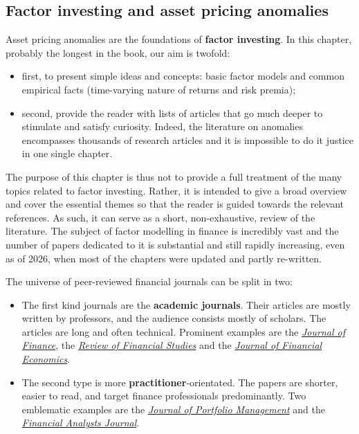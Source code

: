 \subsection{Factor investing and asset pricing anomalies}

Asset pricing anomalies are the foundations of \textbf{factor investing}. In this chapter, probably the longest in the book, our aim is twofold:

\begin{itemize}
\item first, to present simple ideas and concepts: basic factor models and common empirical facts (time-varying nature of returns and risk premia);
\item second, provide the reader with lists of articles that go much deeper to stimulate and satisfy curiosity. Indeed, the literature on anomalies encompasses thousands of research articles and it is impossible to do it justice in one single chapter.
\end{itemize}

The purpose of this chapter is thus not to provide a full treatment of the many topics related to factor investing. Rather, it is intended to give a broad overview and cover the essential themes so that the reader is guided towards the relevant references. As such, it can serve as a short, non-exhaustive, review of the literature. The subject of factor modelling in finance is incredibly vast and the number of papers dedicated to it is substantial and still rapidly increasing, even as of 2026, when most of the chapters were updated and partly re-written.

The universe of peer-reviewed financial journals can be split in two:

\begin{itemize}
\item The first kind journals are the \textbf{academic journals}. Their articles are mostly written by professors, and the audience consists mostly of scholars. The articles are long and often technical. Prominent examples are the \href{https://onlinelibrary.wiley.com/journal/15406261}{\textit{Journal of Finance}}, the \href{https://academic.oup.com/rfs}{\textit{Review of Financial Studies}} and the \href{https://www.sciencedirect.com/journal/journal-of-financial-economics}{\textit{Journal of Financial Economics}}.
\item The second type is more \textbf{practitioner}-orientated. The papers are shorter, easier to read, and target finance professionals predominantly. Two emblematic examples are the \href{https://www.pm-research.com/content/iijpormgmt}{\textit{Journal of Portfolio Management}} and the \href{https://www.tandfonline.com/journals/ufaj20}{\textit{Financial Analysts Journal}}.
\end{itemize}

